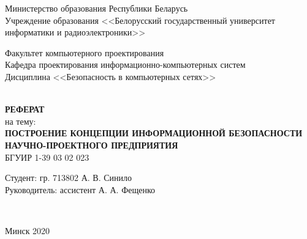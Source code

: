 
\begin{titlepage}
  \begin{center}
    Министерство образования Республики Беларусь\\
    Учреждение образования <<Белорусский государственный университет информатики и радиоэлектроники>>\\[4.4em]

    \begin{minipage}{\textwidth}
      \begin{flushleft}
		  Факультет компьютерного проектирования\\[1em]

		  Кафедра проектирования информационно-компьютерных систем\\[1em]

		  Дисциплина <<Безопасность в компьютерных сетях>>\\[1em]
      \end{flushleft}
    \end{minipage}\\[5em]

	\textbf{\MakeTextUppercase{Реферат}}\\
    {на тему:}\\
	\textbf{\MakeTextUppercase{Построение концепции информационной безопасности научно-проектного предприятия}}\\[1em]

	{БГУИР 1-39 03 02 023}\\[6em]

    \begin{flushright}
      \begin{minipage}{0.55\textwidth}
        \begin{flushleft}
			Студент: гр. 713802 А. В. Синило\\[1em]
			Руководитель: ассистент А. А. Фещенко
        \end{flushleft}
      \end{minipage}\\[2.2em]
    \end{flushright}

        \vfill
    {\normalsize Минск 2020}
  \end{center}
\end{titlepage}
